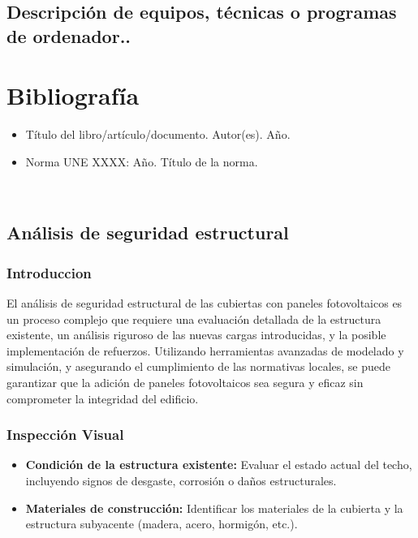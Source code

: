 \documentclass[a4paper,12pt]{article}
\begin{document}
\begin{Form}
\subsection{Descripción de equipos, técnicas o programas de ordenador..}







\newpage
\section*{Bibliografía}
\begin{itemize}
    \item Título del libro/artículo/documento. Autor(es). Año.
    \item Norma UNE XXXX: Año. Título de la norma.
\end{itemize}



\
\subsection{Análisis de seguridad estructural}

\subsubsection*{Introduccion}
    El análisis de seguridad estructural de las cubiertas con paneles fotovoltaicos es un proceso complejo que requiere una evaluación detallada de la estructura existente, un análisis riguroso de las nuevas cargas introducidas, y la posible implementación de refuerzos. Utilizando herramientas avanzadas de modelado y simulación, y asegurando el cumplimiento de las normativas locales, se puede garantizar que la adición de paneles fotovoltaicos sea segura y eficaz sin comprometer la integridad del edificio.

\subsubsection*{Inspección Visual}
\begin{itemize}
    \item \textbf{Condición de la estructura existente:} Evaluar el estado actual del techo, incluyendo signos de desgaste, corrosión o daños estructurales.
    \item \textbf{Materiales de construcción:} Identificar los materiales de la cubierta y la estructura subyacente (madera, acero, hormigón, etc.).
\end{itemize}


\end{Form}
\end{document}

